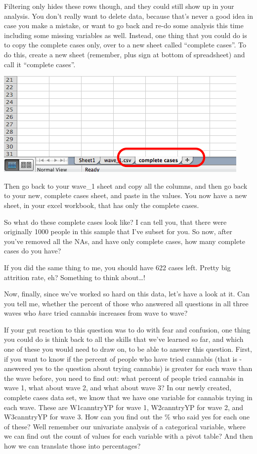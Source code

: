\documentclass[
]{book}
\begin{document}
Filtering only hides these rows though, and they could still show up in your analysis. You don't really want to delete data, because that's never a good idea in case you make a mistake, or want to go back and re-do some analysis this time including some missing variables as well. Instead, one thing that you could do is to copy the complete cases only, over to a new sheet called ``complete cases''. To do this, create a new sheet (remember, plus sign at bottom of spreadsheet) and call it ``complete cases''.

\includegraphics{imgs/cc_new_sheet.png}

Then go back to your wave\_1 sheet and copy all the columns, and then go back to your new, complete cases sheet, and paste in the values. You now have a new sheet, in your excel workbook, that has only the complete cases.

So what do these complete cases look like? I can tell you, that there were originally 1000 people in this sample that I've subset for you. So now, after you've removed all the NAs, and have only complete cases, how many complete cases do you have?

If you did the same thing to me, you should have 622 cases left. Pretty big attrition rate, eh? Something to think about\ldots!

Now, finally, since we've worked so hard on this data, let's have a look at it. Can you tell me, whether the percent of those who answered all questions in all three waves who \emph{have} tried cannabis increases from wave to wave?

If your gut reaction to this question was to do with fear and confusion, one thing you could do is think back to all the skills that we've learned so far, and which one of these you would need to draw on, to be able to answer this question. First, if you want to know if the percent of people who have tried cannabis (that is - answered yes to the question about trying cannabis) is greater for each wave than the wave before, you need to find out: what percent of people tried cannabis in wave 1, what about wave 2, and what about wave 3? In our newly created, complete cases data set, we know that we have one variable for cannabis trying in each wave. These are W1canntryYP for wave 1, W2canntryYP for wave 2, and W3canntryYP for wave 3. How can you find out the \% who said yes for each one of these? Well remember our univariate analysis of a categorical variable, where we can find out the count of values for each variable with a pivot table? And then how we can translate those into percentages?
\end{document}
